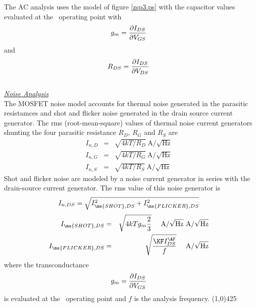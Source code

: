  \marginid{ } 
The AC analysis uses the model of figure \ref{zsp3.ps} with the
capacitor values evaluated at the \dc\ operating point with
\begin{equation}
g_m = {{\textstyle\partial I_{DS}} \over {\textstyle\partial
V_{GS}}}
\end{equation}
and
\begin{equation}
R_{DS} = {{\textstyle\partial I_{DS}} \over {\textstyle\partial
V_{DS}}}
\end{equation}\\[0.1in]
\noindent\underline{\sl \large Noise Analysis}\\[0.1in]
 
 The MOSFET noise model accounts for
thermal noise generated in the parasitic resistamces and shot and
flicker noise generated in the drain source current generator.
The rms (root-mean-square) values of thermal noise current
generators shunting the four parasitic resistance $R_D$, $R_G$ and
$R_S$ are 
\begin{eqnarray}
I_{n,D} &=& \sqrt{4kT/R_D}~\mbox{A/}\sqrt{\mbox{Hz}}\\
I_{n,G} &=& \sqrt{4kT/R_G}~\mbox{A/}\sqrt{\mbox{Hz}}\\
I_{n,S} &=& \sqrt{4kT/R_S}~\mbox{A/}\sqrt{\mbox{Hz}}
\end{eqnarray}
Shot and flicker noise are modeled by a noise current generator in
series with the drain-source current generator. The rms value of
this noise generator is
\begin{equation}
I_{n,DS} = \sqrt{I_{\ms{SHOT},DS}^2 + I_{\ms{FLICKER},DS}^2}
\end{equation}
\begin{eqnarray}
I_{\ms{SHOT},DS} &=& \sqrt{4kTg_m\frac{2}{3}}
~~~~\mbox{A/}\sqrt{\mbox{Hz}}
~\mbox{A/}\sqrt{\mbox{Hz}}\\
I_{\ms{FLICKER},DS} &=& \sqrt{{{\textstyle\KF I_{DS}^{\AF}}
                         \over {\textstyle f }}}
~~~~\mbox{A/}\sqrt{\mbox{Hz}}
\end{eqnarray}
where the transconductance
\begin{equation}
g_m = {{\textstyle\partial I_{DS}} \over {\textstyle\partial
V_{GS}}}
\end{equation}
is evaluated at the \dc\ operating point and $f$ is the analysis
frequency.
\newline
\linethickness{0.5mm} \line(1,0){425}
\newline
